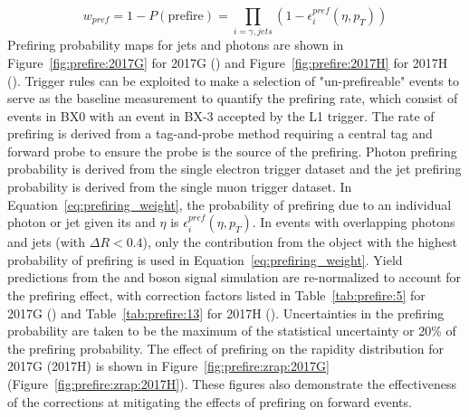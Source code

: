
\begin{equation}
    w_{pref} = 1 - P(\mathrm{prefire}) = \prod_{i=\gamma,jets}{(1 - \epsilon_i^{pref}(\eta,p_T))}
    \label{eq:prefiring_weight}
\end{equation}
Prefiring probability maps for jets and photons are shown in Figure~\ref{fig:prefire:2017G} for 2017G (\sg) and Figure~\ref{fig:prefire:2017H} for 2017H (\sh). Trigger rules can be exploited to make a selection of "un-prefireable" events to serve as the baseline measurement to quantify the prefiring rate, which consist of events in BX0 with an event in BX-3 accepted by the L1 trigger. The rate of prefiring is derived from a tag-and-probe method requiring a central tag and forward probe to ensure the probe is the source of the prefiring.  Photon prefiring probability is derived from the single electron trigger dataset and the jet prefiring probability is derived from the single muon trigger dataset. In Equation~\ref{eq:prefiring_weight}, the probability of prefiring due to an individual photon or jet given its \pt and $\eta$ is $\epsilon_i^{pref}(\eta,p_T)$. In events with overlapping photons and jets (with $\Delta  R < 0.4$), only the contribution from the object with the highest probability of prefiring is used in Equation~\ref{eq:prefiring_weight}\cite{LATHOMAS}. Yield predictions from the \Wpm and \Z boson signal simulation are re-normalized to account for the prefiring effect, with correction factors listed in Table~\ref{tab:prefire:5} for 2017G (\sg) and Table~\ref{tab:prefire:13} for 2017H (\sh). Uncertainties in the prefiring probability are taken to be the maximum of the statistical uncertainty or 20\% of the prefiring probability. The effect of prefiring on the \zee rapidity distribution for 2017G (2017H) is shown in  Figure~\ref{fig:prefire:zrap:2017G} (Figure~\ref{fig:prefire:zrap:2017H}). These figures also demonstrate the effectiveness of the corrections at mitigating the effects of prefiring on forward events.


